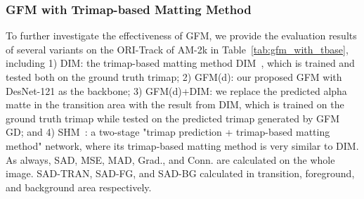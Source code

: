 \documentclass[twocolumn]{svjour3}
\begin{document}
\subsubsection{GFM with Trimap-based Matting Method} To further investigate the effectiveness of GFM, we provide the evaluation results of several variants on the ORI-Track of AM-2k in Table~\ref{tab:gfm_with_tbase}, including 1) DIM: the trimap-based matting method DIM~\citep{xu2017deep}, which is trained and tested both on the ground truth trimap; 2) GFM(d): our proposed GFM with DesNet-121 as the backbone; 3) GFM(d)+DIM: we replace the predicted alpha matte in the transition area with the result from DIM, which is trained on the ground truth trimap while tested on the predicted trimap generated by GFM GD; and 4) SHM~\citep{chen2018semantic}: a two-stage "trimap prediction + trimap-based matting method" network, where its trimap-based matting method is very similar to DIM. As always, SAD, MSE, MAD, Grad., and Conn. are calculated on the whole image. SAD-TRAN, SAD-FG, and SAD-BG calculated in transition, foreground, and background area respectively.


\begin{table}[htbp] 
\caption{Comparison of GFM and its variant with DIM~\citep{xu2017deep} and SHM \citep{chen2018semantic} on the ORI-Track of AM-2k.}
\label{tab:gfm_with_tbase}
\end{table}
\end{document}
